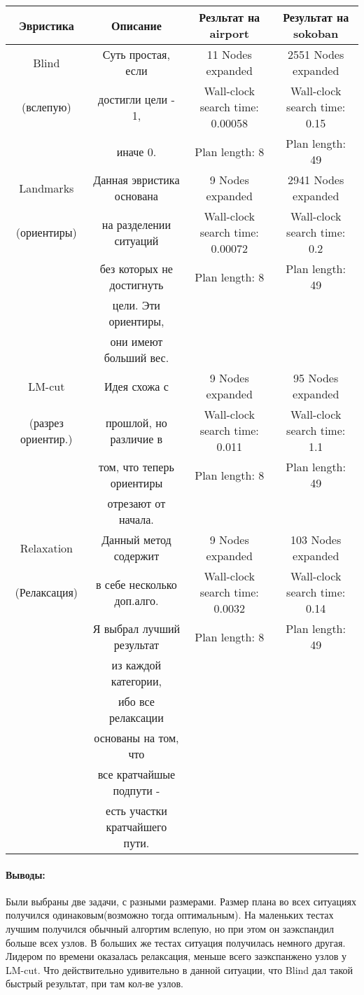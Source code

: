 \documentclass{article}
\begin{document}
\begin{center}
\begin{tabular}{|c|c|c|c|}
\hline
Эвристика & Описание & Резльтат на airport & Результат на sokoban\\
\hline
Blind&Суть простая, если& 11 Nodes expanded &2551 Nodes expanded\\
(вслепую)&достигли цели - 1,& Wall-clock search time: 0.00058 &Wall-clock search time: 0.15\\
&иначе 0.&  Plan length: 8 &Plan length: 49\\
\hline
Landmarks&Данная эвристика основана&9 Nodes expanded&2941 Nodes expanded\\
(ориентиры)&на разделении ситуаций&Wall-clock search time: 0.00072&Wall-clock search time: 0.2\\
&без которых не достигнуть&Plan length: 8&Plan length: 49\\
&цели. Эти ориентиры,&&\\
&они имеют больший вес.&&\\
\hline
LM-cut&Идея схожа с &9 Nodes expanded&95 Nodes expanded\\
(разрез ориентир.)&прошлой, но различие в&Wall-clock search time: 0.011&Wall-clock search time: 1.1\\
&том, что теперь ориентиры& Plan length: 8&Plan length: 49\\
&отрезают от начала.&&\\
\hline
Relaxation&Данный метод содержит&9 Nodes expanded&103 Nodes expanded\\
(Релаксация)&в себе несколько доп.алго.&Wall-clock search time: 0.0032&Wall-clock search time: 0.14\\
&Я выбрал лучший результат&Plan length: 8&Plan length: 49\\
&из каждой категории,&&\\
&ибо все релаксации&&\\
&основаны на том, что&&\\
&все кратчайшые подпути - &&\\
&есть участки кратчайшего пути.&&\\
\hline
\end{tabular}
\end{center}

\paragraph*{Выводы:}
Были выбраны две задачи, с разными размерами. Размер плана во всех ситуациях получился одинаковым(возможно тогда оптимальным). На маленьких тестах лучшим получился обычный алгортим вслепую, но при этом он заэкспандил больше всех узлов. В больших же тестах ситуация получилась немного другая. Лидером по времени оказалась релаксация, меньше всего заэкспанжено узлов у LM-cut. Что действительно удивительно в данной ситуации, что Blind дал такой быстрый результат, при там кол-ве узлов. 
\end{document}
